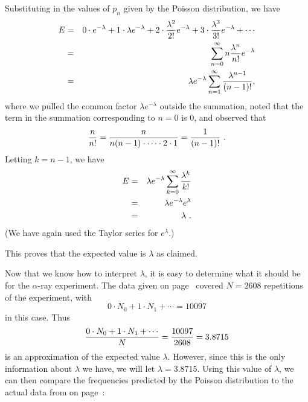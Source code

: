 {{{{Substituting in the values of $p_n$ given by the Poisson distribution,  we have
\begin{eqnarray*}
E & = &0\cdot e^{-\lambda} + 1\cdot \lambda e^{-\lambda} + 
2\cdot {\lambda ^2\over 2!} e^{-\lambda} + 
3\cdot {\lambda ^3\over 3!}e^{-\lambda} + \cdots \\
  & = &\sum_{n=0}^\infty n{\lambda ^n\over n!}e^{-\lambda}\\
  & = &\lambda e^{-\lambda}\sum_{n=1}^\infty {\lambda ^{n-1}\over (n-1)!},
\end{eqnarray*}
where we pulled the common factor  $\lambda e^{-\lambda}$ outside the  summation, noted that the term in the summation corresponding to $n=0$  is 0, and observed that 
\[
{n\over n!} = {n\over n(n-1)\cdot\cdots\cdot2\cdot 1} = {1\over (n-1)!}\ .
\] 
Letting  $k=n-1$, we have
\begin{eqnarray*}
E & = & \lambda e^{-\lambda}\sum_{k=0}^\infty {\lambda ^k\over k!}\\
  & = & \lambda e^{-\lambda}e^{\lambda}\\
  & =& \lambda \ .
\end{eqnarray*} 
(We have again used the Taylor series for $e^{\lambda}$.)

This proves that the expected value is $\lambda$ as claimed.

     Now that we know how to interpret $\lambda$, it is easy to determine what it should be for the $\alpha$-ray experiment.  The data given on page~\pageref{data} covered $N = 2608$ repetitions of the experiment, with
\[
0\cdot N_0 + 1\cdot N_1 + \cdots = 10097
\]
 in this case. Thus
\[
{0\cdot N_0 + 1\cdot N_1 + \cdots\over N} = {10097\over2608}
        = 3.8715
\]
is an approximation of the expected value $\lambda$. However, since this is the only information about $\lambda$ we have, we will let $\lambda = 3.8715$. Using this value of $\lambda$, we can then compare the frequencies predicted by the Poisson distribution to the actual data from on page~\pageref{data}:
\begin{center}



\end{center}}}}}

